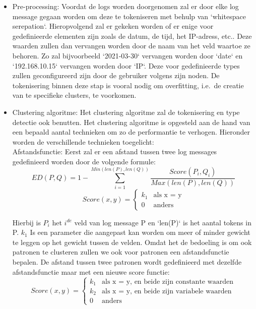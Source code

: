 \begin{itemize}
    \item Pre-processing: Voordat de logs worden doorgenomen zal er door elke log message gegaan worden om deze te tokeniseren met behulp van `whitespace serepation`. Hieropvolgend zal er gekeken worden of er enige voor gedefinieerde elementen zijn zoals de datum, de tijd, het IP-adress, etc.. Deze waarden zullen dan vervangen worden door de naam van het veld waartoe ze behoren. Zo zal bijvoorbeeld `2021-03-30` vervangen worden door `date` en `192.168.10.15` vervangen worden door `IP`. Deze voor gedefinieerde types zullen geconfigureerd zijn door de gebruiker volgens zijn noden. De tokenisering binnen deze stap is vooral nodig om overfitting, i.e.\ de creatie van te specifieke clusters, te voorkomen.\\
    
    \item Clustering algoritme: Het clustering algoritme zal de tokenisering en type detectie ook benutten. Het clustering algoritme is opgesteld aan de hand van een bepaald aantal technieken om zo de performantie te verhogen. Hieronder worden de verschillende technieken toegelicht:\\
    
    \subitem Afstandsfunctie:  Eerst zal er een afstand tussen twee log messages gedefinieerd worden door de volgende formule:
    \[ED(P,Q) = 1 - \sum_{i=1}^{Min(len(P), len(Q))} \frac{Score(P_{i},Q_{i})}{Max(len(P), len(Q))} \]
    \[Score(x,y) = \begin{cases}
        k_{1} & \text{als x = y}\\
        0 & \text{anders}
    \end{cases}\]
    
    Hierbij is \(P_{i}\) het \(i^{de}\) veld van log message P en `len(P)` is het aantal tokens in P. \(k_{1}\) Is een parameter die aangepast kan worden om meer of minder gewicht te leggen op het gewicht tussen de velden. Omdat het de bedoeling is om ook patronen te clusteren zullen we ook voor patronen een afstandsfunctie bepalen. De afstand tussen twee patronen wordt gedefinieerd met dezelfde afstandsfunctie maar met een nieuwe score functie:
    \[Score(x,y) = \begin{cases}
        k_{1} & \text{als x = y, en beide zijn constante waarden}\\
        k_{2} & \text{als x = y, en beide zijn variabele waarden}\\
        0 & \text{anders}
    \end{cases}\]
    

\end{itemize}
